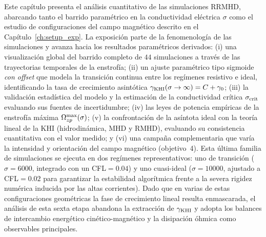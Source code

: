 

\primerparrafo Este capítulo presenta el análisis cuantitativo de las simulaciones RRMHD, abarcando tanto el barrido paramétrico en la conductividad eléctrica $\sigma$ como el estudio de configuraciones del campo magnético descrito en el Capítulo~\ref{ch:setup_exp}. La exposición parte de la fenomenología de las simulaciones y avanza hacia los resultados paramétricos derivados: (i) una visualización global del barrido completo de $44$ simulaciones a través de las trayectorias temporales de la enstrofía; (ii) un ajuste paramétrico tipo sigmoide \emph{con offset} que modela la transición continua entre los regímenes resistivo e ideal, identificando la tasa de crecimiento asintótica $\gamma_{\mathrm{KHI}}(\sigma\to\infty)=C+\gamma_0$; (iii) la validación estadística del modelo y la estimación de la conductividad crítica $\sigma_{\mathrm{crit}}$ evaluando sus fuentes de incertidumbre; (iv) las leyes de potencia empíricas de la enstrofía máxima $\Omega_{zp}^{\max}(\sigma)$; (v) la confrontación de la asíntota ideal con la teoría lineal de la KHI (hidrodinámica, MHD y RMHD), evaluando su consistencia cuantitativa con el valor medido; y (vi) una campaña complementaria que varía la intensidad y orientación del campo magnético (objetivo~4). Esta última familia de simulaciones se ejecuta en dos regímenes representativos: uno de transición ($\sigma=6000$, integrado con un CFL$=0.04$) y uno cuasi-ideal ($\sigma=10000$, ajustado a CFL$=0.02$ para garantizar la estabilidad algorítmica frente a la severa rigidez numérica inducida por las altas corrientes). Dado que en varias de estas configuraciones geométricas la fase de crecimiento lineal resulta enmascarada, el análisis de esta sexta etapa abandona la extracción de $\gamma_{\mathrm{KHI}}$ y adopta los balances de intercambio energético cinético-magnético y la disipación óhmica como observables principales.

